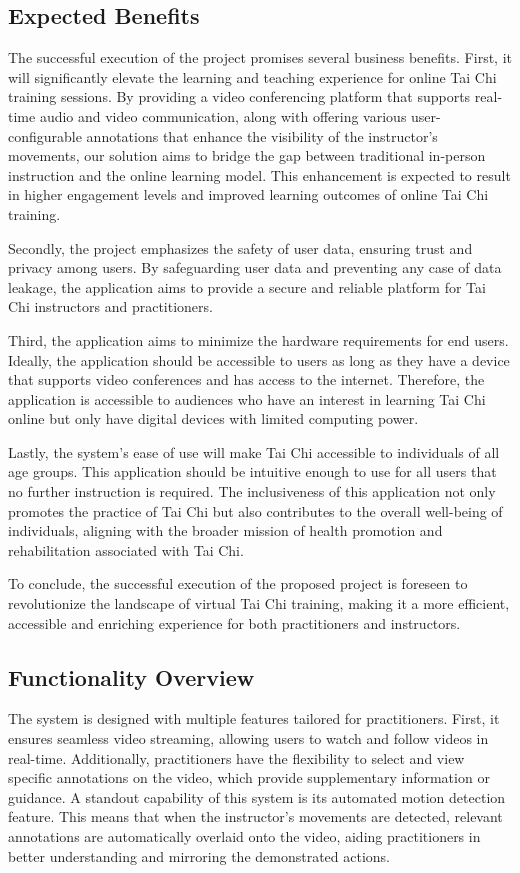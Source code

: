 \documentclass[12pt]{article}
\begin{document}
\subsection{Expected Benefits}
The successful execution of the project promises several business benefits. First, it will significantly elevate the learning and teaching experience for online Tai Chi training sessions. By providing a video conferencing platform that supports real-time audio and video communication, along with offering various user-configurable annotations that enhance the visibility of the instructor’s movements, our solution aims to bridge the gap between traditional in-person instruction and the online learning model. This enhancement is expected to result in higher engagement levels and improved learning outcomes of online Tai Chi training.

Secondly, the project emphasizes the safety of user data, ensuring trust and privacy among users. By safeguarding user data and preventing any case of data leakage, the application aims to provide a secure and reliable platform for Tai Chi instructors and practitioners.

Third, the application aims to minimize the hardware requirements for end users. Ideally, the application should be accessible to users as long as they have a device that supports video conferences and has access to the internet. Therefore, the application is accessible to audiences who have an interest in learning Tai Chi online but only have digital devices with limited computing power.

Lastly, the system’s ease of use will make Tai Chi accessible to individuals of all age groups. This application should be intuitive enough to use for all users that no further instruction is required. The inclusiveness of this application not only promotes the practice of Tai Chi but also contributes to the overall well-being of individuals, aligning with the broader mission of health promotion and rehabilitation associated with Tai Chi.

To conclude, the successful execution of the proposed project is foreseen to revolutionize the landscape of virtual Tai Chi training, making it a more efficient, accessible and enriching experience for both practitioners and instructors.

\subsection{Functionality Overview}
The system is designed with multiple features tailored for practitioners. First, it ensures seamless video streaming, allowing users to watch and follow videos in real-time. Additionally, practitioners have the flexibility to select and view specific annotations on the video, which provide supplementary information or guidance. A standout capability of this system is its automated motion detection feature. This means that when the instructor's movements are detected, relevant annotations are automatically overlaid onto the video, aiding practitioners in better understanding and mirroring the demonstrated actions.
\end{document}

